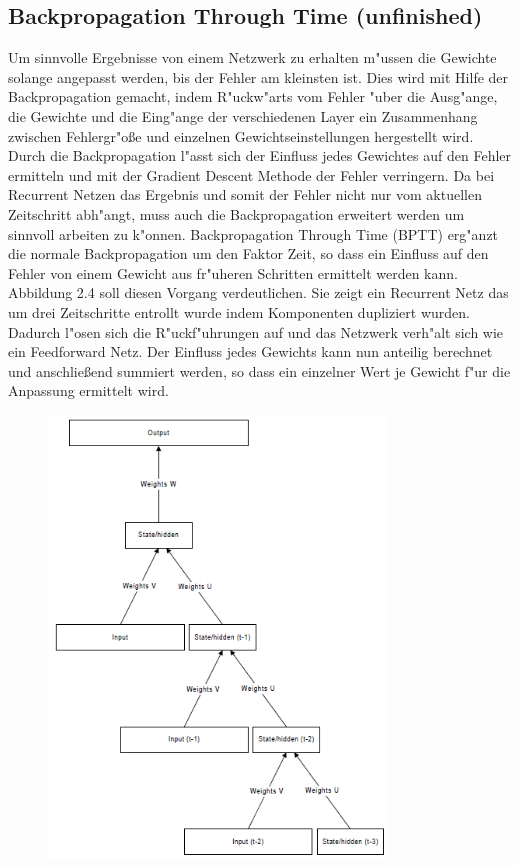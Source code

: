 {\subsection{Backpropagation Through Time (unfinished)}
Um sinnvolle Ergebnisse von einem Netzwerk zu erhalten m"ussen die Gewichte solange angepasst werden, bis der Fehler am kleinsten ist. Dies wird mit Hilfe der Backpropagation gemacht, indem R"uckw"arts vom Fehler "uber die Ausg"ange, die Gewichte und die Eing"ange der verschiedenen Layer ein Zusammenhang zwischen Fehlergr"o{\ss}e und einzelnen Gewichtseinstellungen hergestellt wird. Durch die Backpropagation l"asst sich der Einfluss jedes Gewichtes auf den Fehler ermitteln und mit der Gradient Descent Methode der Fehler verringern.
Da bei Recurrent Netzen das Ergebnis und somit der Fehler nicht nur vom aktuellen Zeitschritt abh"angt, muss auch die Backpropagation erweitert werden um sinnvoll arbeiten zu k"onnen. Backpropagation Through Time (BPTT) erg"anzt die normale Backpropagation um den Faktor Zeit, so dass ein Einfluss auf den Fehler von einem Gewicht aus fr"uheren Schritten ermittelt werden kann. Abbildung 2.4 soll diesen Vorgang verdeutlichen. Sie zeigt ein Recurrent Netz das um drei Zeitschritte entrollt wurde indem Komponenten dupliziert wurden. Dadurch l"osen sich die R"uckf"uhrungen auf und das Netzwerk verh"alt sich wie ein Feedforward Netz. Der Einfluss jedes Gewichts kann nun anteilig berechnet und anschlie{\ss}end summiert werden, so dass ein einzelner Wert je Gewicht f"ur die Anpassung ermittelt wird.
\renewcommand{\figurename}{Abb.}
\begin{figure}[htp]
\centering
\includegraphics[width=0.8\textwidth]{pictures/bptt.png}

\end{figure}}
